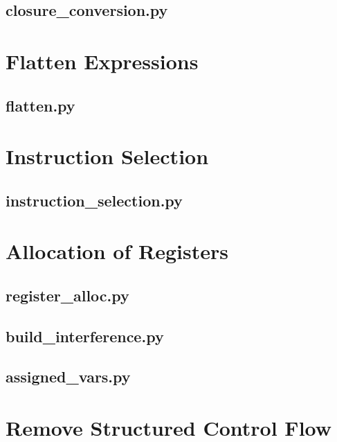 \documentclass[letter,10pt]{article}
\begin{document}
\subsection{closure\_conversion.py}


\clearpage
\section{Flatten Expressions}

\subsection{flatten.py}


\clearpage
\section{Instruction Selection}

\subsection{instruction\_selection.py}


\clearpage
\section{Allocation of Registers}

\subsection{register\_alloc.py}


\subsection{build\_interference.py}


\subsection{assigned\_vars.py}


\clearpage
\section{Remove Structured Control Flow}
\end{document}

